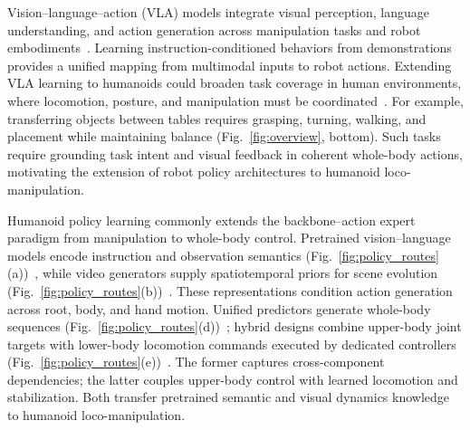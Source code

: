 







Vision--language--action (VLA) models integrate visual perception, language understanding, and action generation across manipulation tasks and robot embodiments~\cite{rt2,openvla,pi0,wang2026limitsvisionandlanguagenavigation,wang2025dreamnavtrajectorybasedimaginativeframework}.
Learning instruction-conditioned behaviors from demonstrations provides a unified mapping from multimodal inputs to robot actions.
Extending VLA learning to humanoids could broaden task coverage in human environments, where locomotion, posture, and manipulation must be coordinated~\cite{grootn1,psi0,openhlm}.
For example, transferring objects between tables requires grasping, turning, walking, and placement while maintaining balance (Fig.~\ref{fig:overview}, bottom).
Such tasks require grounding task intent and visual feedback in coherent whole-body actions, motivating the extension of robot policy architectures to humanoid loco-manipulation.





Humanoid policy learning commonly extends the backbone--action expert paradigm from manipulation to whole-body control.
Pretrained vision--language models encode instruction and observation semantics (Fig.~\ref{fig:policy_routes}(a))~\cite{grootn1,psi0,openhlm}, while video generators supply spatiotemporal priors for scene evolution (Fig.~\ref{fig:policy_routes}(b))~\cite{motionwam,wholebodywam_wbc}.
These representations condition action generation across root, body, and hand motion.
Unified predictors generate whole-body sequences (Fig.~\ref{fig:policy_routes}(d))~\cite{openhlm,motionwam}; hybrid designs combine upper-body joint targets with lower-body locomotion commands executed by dedicated controllers (Fig.~\ref{fig:policy_routes}(e))~\cite{humanoidexo,wholebodyvla}.
The former captures cross-component dependencies; the latter couples upper-body control with learned locomotion and stabilization.
Both transfer pretrained semantic and visual dynamics knowledge to humanoid loco-manipulation.


